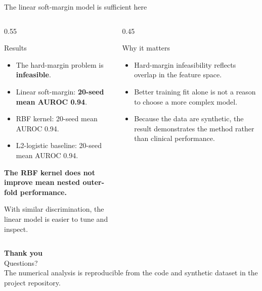 \documentclass[aspectratio=169,11pt]{beamer}
\begin{document}
\begin{frame}{The linear soft-margin model is sufficient here}
  \begin{columns}[T]
    \begin{column}{0.55\textwidth}
      \begin{block}{Results}
        \begin{itemize}
          \item The hard-margin problem is \textbf{infeasible}.
          \item Linear soft-margin: \textbf{20-seed mean AUROC 0.94}.
          \item RBF kernel: 20-seed mean AUROC 0.94.
          \item L2-logistic baseline: 20-seed mean AUROC 0.94.
        \end{itemize}
        \vspace{0.3em}
        \textbf{The RBF kernel does not improve mean nested outer-fold performance.}
      \end{block}
      With similar discrimination, the linear model is easier to tune and inspect.
    \end{column}
    \begin{column}{0.45\textwidth}
      \begin{block}{Why it matters}
        \small
        \begin{itemize}
          \item Hard-margin infeasibility reflects overlap in the feature space.
          \item Better training fit alone is not a reason to choose a more complex model.
          \item Because the data are synthetic, the result demonstrates the method rather than clinical performance.
        \end{itemize}
      \end{block}
    \end{column}
  \end{columns}
\end{frame}

\begin{frame}[plain]
  \vfill
  \centering
  {\LARGE\bfseries\color{UPAblue} Thank you}\\[0.6em]
  {\large Questions?}\\[1.4em]
  {\footnotesize The numerical analysis is reproducible from the code and synthetic dataset in the project repository.}
  \vfill
\end{frame}
\end{document}
